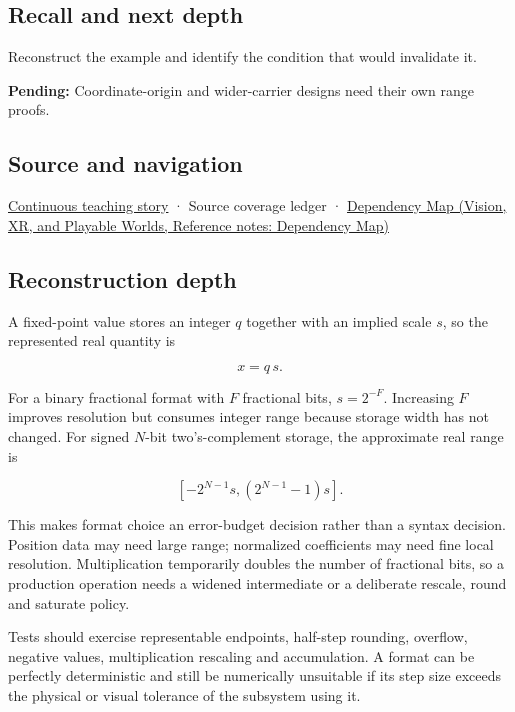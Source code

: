 \subsection{Recall and next depth}\label{appendix-ceb4c4a9b5a1-recall-and-next-depth}

\hypertarget{appendix-ceb4c4a9b5a1-recall-and-next-depth}{}

Reconstruct the example and identify the condition that would invalidate it.

\textbf{Pending:} Coordinate-origin and wider-carrier designs need their own range proofs.

\subsection{Source and navigation}\label{appendix-ceb4c4a9b5a1-source-and-navigation}

\hypertarget{appendix-ceb4c4a9b5a1-source-and-navigation}{}

\hyperref[01-foundations-i-ch001-choosing-what-information-to-keep]{Continuous teaching story} · {Source coverage ledger} · \href{../07-Vision-XR-and-Playable-Worlds/main.pdf\#nameddest=appendix-4ad47bdd269a}{Dependency Map (Vision, XR, and Playable Worlds, Reference notes: Dependency Map)}

\subsection{Reconstruction depth}\label{appendix-ceb4c4a9b5a1-reconstruction-depth}

\hypertarget{appendix-ceb4c4a9b5a1-reconstruction-depth}{}

A fixed-point value stores an integer \(q\) together with an implied scale \(s\), so the represented real quantity is

\[
x=q\,s.
\]

For a binary fractional format with \(F\) fractional bits, \(s=2^{-F}\). Increasing \(F\) improves resolution but consumes integer range because storage width has not changed. For signed \(N\)-bit two's-complement storage, the approximate real range is

\[
[-2^{N-1}s,(2^{N-1}-1)s].
\]

This makes format choice an error-budget decision rather than a syntax decision. Position data may need large range; normalized coefficients may need fine local resolution. Multiplication temporarily doubles the number of fractional bits, so a production operation needs a widened intermediate or a deliberate rescale, round and saturate policy.

Tests should exercise representable endpoints, half-step rounding, overflow, negative values, multiplication rescaling and accumulation. A format can be perfectly deterministic and still be numerically unsuitable if its step size exceeds the physical or visual tolerance of the subsystem using it.
